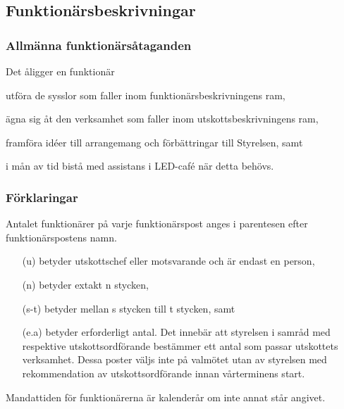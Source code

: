 \documentclass[10pt]{article}
\begin{document}
\subsection{Funktionärsbeskrivningar}
\subsubsection{Allmänna funktionärsåtaganden}
Det åligger en funktionär
\begin{attlist}
    \item utföra de sysslor som faller inom funktionärsbeskrivningens ram,
    \item ägna sig åt den verksamhet som faller inom utskottsbeskrivningens ram,
    \item framföra idéer till arrangemang och förbättringar till Styrelsen, samt
    \item i mån av tid bistå med assistans i LED-café när detta behövs.
\end{attlist}

\subsubsection{Förklaringar}
Antalet funktionärer på varje funktionärspost anges i parentesen efter funktionärspostens namn.
\begin{itemize}
    \item[(u)] betyder utskottschef eller motsvarande och är endast en person,
    \item[(n)] betyder extakt n stycken,
    \item[(s-t)] betyder mellan s stycken till t stycken, samt
    \item[(e.a)] betyder erforderligt antal. Det innebär att styrelsen i samråd med respektive utskottsordförande bestämmer ett antal som passar utskottets verksamhet. Dessa poster väljs inte på valmötet utan av styrelsen med rekommendation av utskottsordförande innan vårterminens start.
\end{itemize}
Mandattiden för funktionärerna är kalenderår om inte annat står angivet.
\end{document}

